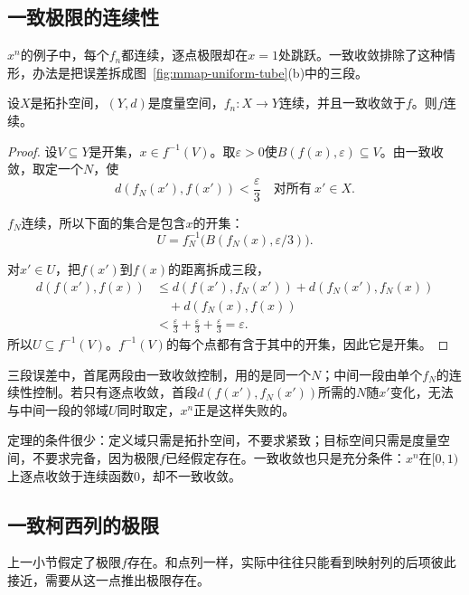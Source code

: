 \subsection{一致极限的连续性}
\label{sec:mmap-uniform-limit-continuity}

$x^n$的例子中，每个$f_n$都连续，逐点极限却在$x=1$处跳跃。一致收敛排除了这种情形，办法是把误差拆成图~\ref{fig:mmap-uniform-tube}(b)中的三段。

\begin{theorem}[一致极限保持连续]
\label{thm:mmap-uniform-limit-continuous}
设$X$是拓扑空间，$(Y,d)$是度量空间，$f_n:X\to Y$连续，并且一致收敛于$f$。则$f$连续。
\end{theorem}

\begin{proof}
设$V\subseteq Y$是开集，$x\in f^{-1}(V)$。取$\varepsilon>0$使$B(f(x),\varepsilon)\subseteq V$。由一致收敛，取定一个$N$，使
\[
 d(f_N(x'),f(x'))<\frac\varepsilon3\quad\text{对所有}\ x'\in X.
\]

$f_N$连续，所以下面的集合是包含$x$的开集：
\[
 U=f_N^{-1}\bigl(B(f_N(x),\varepsilon/3)\bigr).
\]

对$x'\in U$，把$f(x')$到$f(x)$的距离拆成三段，
\[
 \begin{aligned}
 d(f(x'),f(x))
 &\leq d(f(x'),f_N(x'))+d(f_N(x'),f_N(x))\\
 &\quad+d(f_N(x),f(x))\\
 &<\frac\varepsilon3+\frac\varepsilon3+\frac\varepsilon3=\varepsilon.
 \end{aligned}
\]
所以$U\subseteq f^{-1}(V)$。$f^{-1}(V)$的每个点都有含于其中的开集，因此它是开集。
\end{proof}

三段误差中，首尾两段由一致收敛控制，用的是同一个$N$；中间一段由单个$f_N$的连续性控制。若只有逐点收敛，首段$d(f(x'),f_N(x'))$所需的$N$随$x'$变化，无法与中间一段的邻域$U$同时取定，$x^n$正是这样失败的。

定理的条件很少：定义域只需是拓扑空间，不要求紧致；目标空间只需是度量空间，不要求完备，因为极限$f$已经假定存在。一致收敛也只是充分条件：$x^n$在$[0,1)$上逐点收敛于连续函数$0$，却不一致收敛。

\subsection{一致柯西列的极限}
\label{sec:mmap-uniform-cauchy}

上一小节假定了极限$f$存在。和点列一样，实际中往往只能看到映射列的后项彼此接近，需要从这一点推出极限存在。

